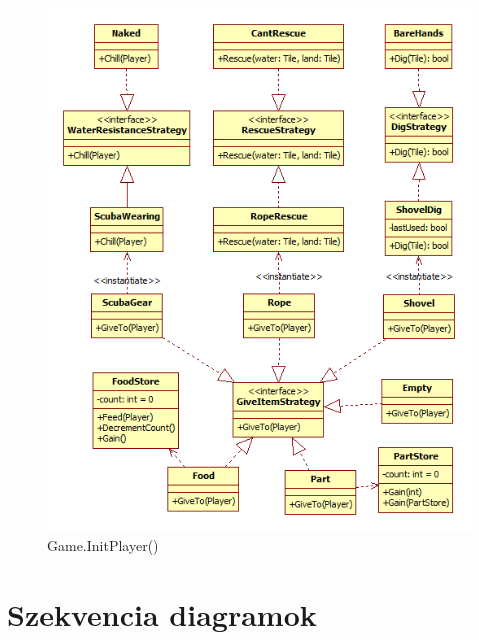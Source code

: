 \begin{figure}[H]
	\begin{center}
		\includegraphics[width=17cm]{chapters/chapter03/ClassDiagramPart2.png}
		\caption{Game.InitPlayer()}
		\label{fig:GameInitPlayer}
	\end{center}
\end{figure}

\newpage
\section{Szekvencia diagramok}

